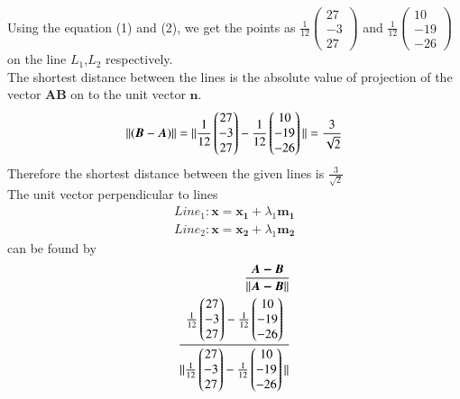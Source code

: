 \documentclass[journal,12pt,twocolumn]{IEEEtran}
\newcommand{\norm}[1]{\| #1 \|}
\begin{document}
Using the equation (1) and (2), we get the points as $\frac{1}{12}\begin{pmatrix}27\\-3\\27\end{pmatrix}$ and $\frac{1}{12}\begin{pmatrix}10\\-19\\-26\end{pmatrix}$ on the line $L_1$,$L_2$ respectively.\\
\vspace{5mm}
The shortest distance between the lines is the absolute value of projection of the vector $\bm{AB}$ on to the unit vector $\bm{n}$.
\begin{equation}
    \norm{(\bm{B}-\bm{A})}\\
    =\norm{\frac{1}{{12}}\begin{pmatrix}27\\-3\\27\end{pmatrix}-\frac{1}{{12}}\begin{pmatrix}10\\-19\\-26\end{pmatrix}}\\
    =\frac{3}{\sqrt{2}}
\end{equation}
Therefore the shortest distance between the given lines is $\frac{3}{\sqrt{2}}$\\
The unit vector perpendicular to lines \\
\begin{align}
    Line_1\colon \bm{x}=\bm{x_1}+\lambda_1\bm{m_1}\\
    Line_2\colon \bm{x}=\bm{x_2}+\lambda_1\bm{m_2}
\end{align}
can be found by 
\begin{align}
    \frac{\bm{A-B}}{\norm{\bm{A-B}}}\\
    \frac{\frac{1}{{12}}\begin{pmatrix}27\\-3\\27\end{pmatrix}-\frac{1}{{12}}\begin{pmatrix}10\\-19\\-26\end{pmatrix}}{\norm{\frac{1}{{12}}\begin{pmatrix}27\\-3\\27\end{pmatrix}-\frac{1}{{12}}\begin{pmatrix}10\\-19\\-26\end{pmatrix}}}\notag
\end{align}
\end{document}
